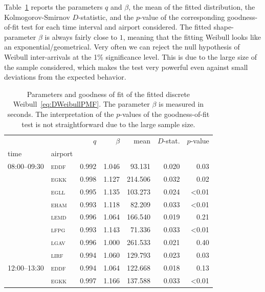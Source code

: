 \documentclass[]{elsarticle}
\newcommand{\airp}[1]{\textcolor{#1}{\textsc{#1}}}
\begin{document}
Table~\ref{tab:fitted} reports the parameters \(q\) and \(\beta\), the mean of the fitted distribution, the Kolmogorov-Smirnov \(D\)-statistic, and the \(p\)-value of the corresponding goodness-of-fit test for each time interval and airport considered.
The fitted shape-parameter \(\beta\) is always fairly close to \(1\), meaning that the fitting Weibull looks like an exponential/geometrical.
Very often we can reject the null hypothesis of Weibull inter-arrivals at the 1\% significance level.
This is due to the large size of the sample considered, which makes the test very powerful even against small deviations from the expected behavior.

\begin{table}
    \centering
    \caption{Parameters and goodness of fit of the fitted discrete Weibull~\eqref{eq:DWeibullPMF}. The parameter \(\beta\) is measured in seconds. The interpretation of the \(p\)-values of the goodness-of-fit test is not straightforward due to the large sample size.}
    \label{tab:fitted}
    \begin{tabular}{llrrrrr}
      \toprule
                   &             &   \(q\) & \(\beta\) &    mean & \(D\)-stat. & \(p\)-value \\
      time & airport &       &         &         &           &           \\
      \midrule
      08:00--09:30 & \airp{eddf} & 0.992 &   1.046 &  93.131 &     0.020 &      0.03 \\
                   & \airp{egkk} & 0.998 &   1.127 & 214.506 &     0.032 &      0.02 \\
                   & \airp{egll} & 0.995 &   1.135 & 103.273 &     0.024 &     <0.01 \\
                   & \airp{eham} & 0.993 &   1.118 &  82.209 &     0.033 &     <0.01 \\
                   & \airp{lemd} & 0.996 &   1.064 & 166.540 &     0.019 &      0.21 \\
                   & \airp{lfpg} & 0.993 &   1.143 &  71.336 &     0.033 &     <0.01 \\
                   & \airp{lgav} & 0.996 &   1.000 & 261.533 &     0.021 &      0.40 \\
                   & \airp{lirf} & 0.994 &   1.060 & 129.793 &     0.023 &      0.03 \\
      12:00--13:30 & \airp{eddf} & 0.994 &   1.064 & 122.668 &     0.018 &      0.13 \\
                   & \airp{egkk} & 0.997 &   1.166 & 137.588 &     0.033 &     <0.01 \\

\end{tabular}
\end{table}
\end{document}
